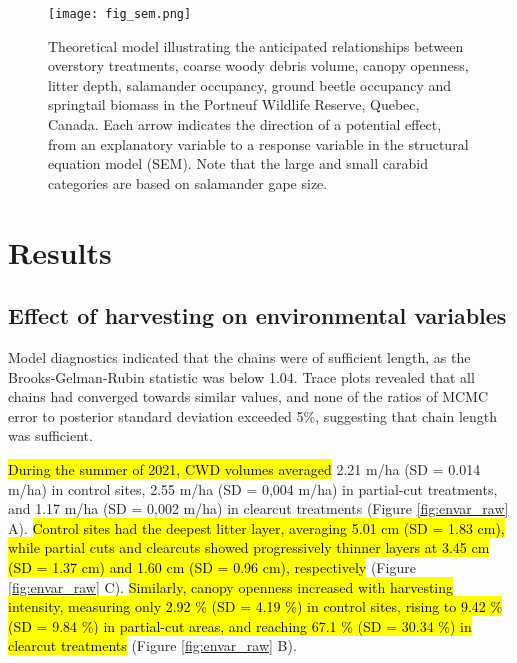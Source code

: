 \vspace{10pt}

\begin{figure}[h!]
	\centering
	\texttt{[image: fig\_sem.png]}
	\caption[Theoretical model illustrating the anticipated relationships between overstory treatments, environmental variables and species groups.]
  {Theoretical model illustrating the anticipated relationships between overstory treatments, coarse woody debris volume, canopy openness, litter depth,
   salamander occupancy, ground beetle occupancy and springtail biomass in the Portneuf Wildlife Reserve, Quebec, Canada. 
   Each arrow indicates the direction of a potential effect, from an explanatory variable to a response variable in the structural equation model (SEM). 
   Note that the large and small carabid categories are based on salamander gape size.}
	\label{fig:SEM}
\end{figure} 

\clearpage


\section*{Results}
\label{sec:results1}

\subsection*{Effect of harvesting on environmental variables}
\label{subsec:ResEnv}

Model diagnostics indicated that the chains were of sufficient length, as the Brooks-Gelman-Rubin statistic was below 1.04. 
Trace plots revealed that all chains had converged towards similar values, and none of the ratios of MCMC error to posterior standard deviation exceeded 5\%, suggesting that chain length was sufficient. 

\hl{During the summer of 2021, CWD volumes averaged} 2.21 m/ha (SD = 0.014 m/ha) in control sites, 2.55 m/ha (SD = 0,004 m/ha) in partial-cut treatments, 
and 1.17 m/ha (SD = 0,002 m/ha) in clearcut treatments (Figure \ref{fig:envar_raw} A). 
\hl{Control sites had the deepest litter layer, averaging 5.01 cm (SD = 1.83 cm), while partial cuts and clearcuts showed progressively thinner layers at 3.45 cm (SD = 1.37 cm) and 1.60 cm (SD = 0.96 cm), respectively} (Figure \ref{fig:envar_raw} C). 
\hl{Similarly, canopy openness increased with harvesting intensity, 
measuring only 2.92 \% (SD = 4.19 \%) in control sites, rising to 9.42 \% (SD = 9.84 \%) in partial-cut areas, and reaching 67.1 \% (SD = 30.34 \%) in clearcut treatments} (Figure \ref{fig:envar_raw} B).

